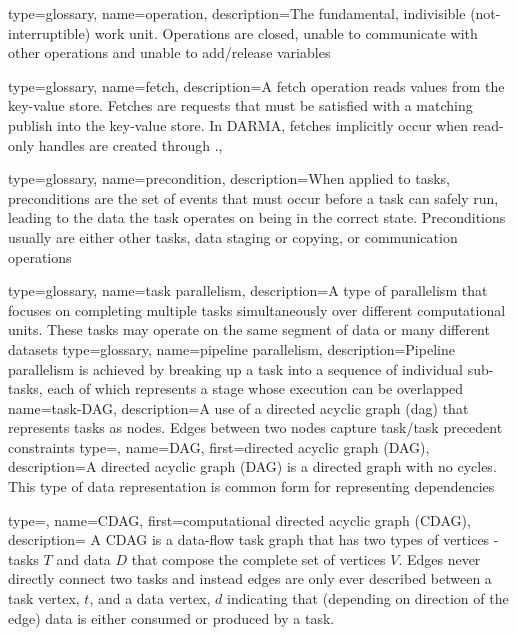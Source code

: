 {
  type=glossary,
  name={operation},
  description={The fundamental, indivisible (not-interruptible) work unit.
  Operations are closed, unable to communicate with other operations and unable to add/release variables}
}

{
  type=glossary,
  name={fetch},
  description={A fetch operation reads values from the key-value store. Fetches are requests that must be satisfied with a matching publish into the key-value store. In DARMA, fetches implicitly occur when read-only handles are created through .},
}

{
  type=glossary,
  name={precondition},
  description={When applied to tasks, preconditions are the set of events that must occur before a task can safely run,
    leading to the data the task operates on being in the correct state. Preconditions usually are either other tasks,
    data staging or copying, or communication operations}
}

{
  type=glossary,
  name={task parallelism},
  description={A type of parallelism that focuses on completing multiple tasks simultaneously over different computational units. These tasks may operate on the same segment of data or many different datasets}
}
{
  type=glossary,
  name={pipeline parallelism},
  description={Pipeline parallelism is achieved by breaking up a task into a sequence of
individual sub-tasks, each of which represents a stage whose execution can be
  overlapped}
}
{
  name={task-DAG},
  description={A use of a directed acyclic graph (\gls{dag}) that represents
    tasks as nodes. Edges between two nodes capture task/task precedent
      constraints}
}
{
  type=\acronymtype,
  name={DAG},
  first={directed acyclic graph (DAG)},
  description={A directed acyclic graph (DAG) is a directed graph with no cycles. This type of data representation is common form for representing dependencies}
}

{
  type=\acronymtype,
  name={CDAG},
  first={computational directed acyclic graph (CDAG)},
  description={ A CDAG is a data-flow task graph that has two
types of vertices - tasks $T$ and data $D$ that compose the complete set of vertices $V$.
Edges never directly connect two tasks and instead edges are only ever described between a task vertex, $t$, and a data vertex, $d$
indicating that (depending on direction of the edge) data is either consumed or produced by a task.
}
}


